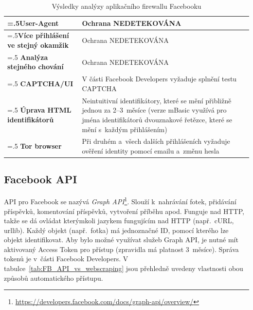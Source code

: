 \begin{table}[H]
\begin{tabularx}{\linewidth}{
    |>{\hsize=.5\hsize}X|%
    >{\hsize=1.5\hsize}X|%
  }
\hline
\textbf{User-Agent} & Ochrana NEDETEKOVÁNA \\
\hline
\textbf{Více přihlášení ve stejný okamžik} & Ochrana NEDETEKOVÁNA \\
\hline
\textbf{Analýza stejného chování} & Ochrana NEDETEKOVÁNA \\
\hline
\textbf{CAPTCHA/UI} & V části Facebook Developers vyžaduje splnění testu CAPTCHA \\
\hline
\textbf{Úprava HTML identifikátorů} & Neintuitivní identifikátory, které se mění přibližně jednou za 2--3~měsíce (verze mBasic využívá pro jména identifikátorů dvouznakové řetězce, které se mění s~každým přihlášením)\\
\hline
\textbf{Tor browser} & Při druhém a~všech dalších přihlášeních vyžaduje ověření identity pomocí emailu a~změnu hesla \\
\hline
\end{tabularx}

\caption{Výsledky analýzy aplikačního firewallu Facebooku}
\label{tab:FB_analyse}
\end{table}

\subsection*{Facebook API}
API pro Facebook se nazývá \textit{Graph API}\footnote{\href{https://developers.facebook.com/docs/graph-api/overview/}{https://developers.facebook.com/docs/graph-api/overview/}}. Slouží k~nahrávání fotek, přidávání příspěvků, komentování příspěvků, vytvoření příběhu apod. Funguje nad HTTP, takže se dá ovládat kterýmkoli jazykem fungujícím nad HTTP (např.~cURL, urllib). Každý objekt (např.~fotka) má jednoznačné ID, pomocí kterého lze objekt identifikovat. Aby bylo možné využívat služeb Graph API, je nutné mít aktivovaný Access Token pro přístup (zpravidla má platnost 3~měsíce). Správa tokenů je v~části Facebook Developers.
V tabulce~\ref{tab:FB_API_vs_webscraping} jsou přehledně uvedeny vlastnosti obou způsobů automatického přístupu.

